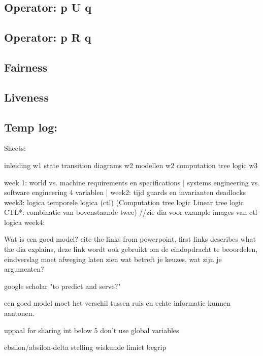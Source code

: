 \documentclass{article}
\begin{document}
\subsection{Operator: p U q}

\subsection{Operator: p R q}

\subsection{Fairness}

\subsection{Liveness}

\newpage
\subsection{Temp log:}
Sheets:

inleiding w1
state transition diagrams w2
modellen w2
computation tree logic w3


week 1: 
world vs. machine
requirements en specifications |
systems engineering vs. software engineering
4 variablen |
week2:
tijd
guards en invarianten
deadlocks
week3:
logica
temporele logica (ctl)
(Computation tree logic
Linear tree logic
CTL*: combinatie van bovenstaande twee)
//zie dia voor example images van ctl logica
week4:




Wat is een goed model? cite the links from powerpoint, first links describes what the dia explains, deze link wordt ook gebruikt om de eindopdracht te beoordelen, eindverslag moet afweging laten zien wat betreft je keuzes, wat zijn je argumenten?

google scholar "to predict and serve?"

een goed model moet het verschil tussen ruis en echte informatie kunnen aantonen.

uppaal for sharing int below 5 don't use global variables

ebsilon/absilon-delta stelling wiskunde limiet begrip
\newpage


\end{document}
